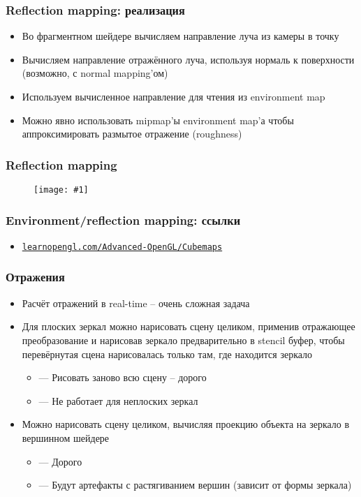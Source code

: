 \documentclass[10pt]{beamer}
\newcommand{\slideimage}[1]{
  \begin{figure}
    \begin{adjustbox}{width=\textwidth, totalheight=\textheight-2\baselineskip-2\baselineskip,keepaspectratio}
      \texttt{[image: \#1]}
    \end{adjustbox}
  \end{figure}
}
\begin{document}
\begin{frame}[fragile]
\frametitle{Reflection mapping: реализация}
\begin{itemize}
\item Во фрагментном шейдере вычисляем направление луча из камеры в точку
\pause
\item Вычисляем направление отражённого луча, используя нормаль к поверхности (возможно, с normal mapping'ом)
\pause
\item Используем вычисленное направление для чтения из environment map
\pause
\item Можно явно использовать mipmap'ы environment map'а чтобы аппроксимировать размытое отражение (roughness)
\end{itemize}
\end{frame}

\begin{frame}[fragile]
\frametitle{Reflection mapping}
\slideimage{reflection.png}
\end{frame}

\begin{frame}[fragile]
\frametitle{Environment/reflection mapping: ссылки}
\begin{itemize}
\item \href{https://learnopengl.com/Advanced-OpenGL/Cubemaps}{\texttt{learnopengl.com/Advanced-OpenGL/Cubemaps}}
\end{itemize}
\end{frame}

\begin{frame}[fragile]
\frametitle{Отражения}
\begin{itemize}
\item Расчёт отражений в real-time -- очень сложная задача
\pause
\item Для плоских зеркал можно нарисовать сцену целиком, применив отражающее преобразование и нарисовав зеркало предварительно в stencil буфер, чтобы перевёрнутая сцена нарисовалась только там, где находится зеркало
\pause
\begin{itemize}
\item {\color{red}—} Рисовать заново всю сцену -- дорого
\item {\color{red}—} Не работает для неплоских зеркал
\end{itemize}
\pause
\item Можно нарисовать сцену целиком, вычисляя проекцию объекта на зеркало в вершинном шейдере
\begin{itemize}
\item {\color{red}—} Дорого
\item {\color{red}—} Будут артефакты с растягиванием вершин (зависит от формы зеркала)
\end{itemize}
\end{itemize}
\end{frame}
\end{document}
